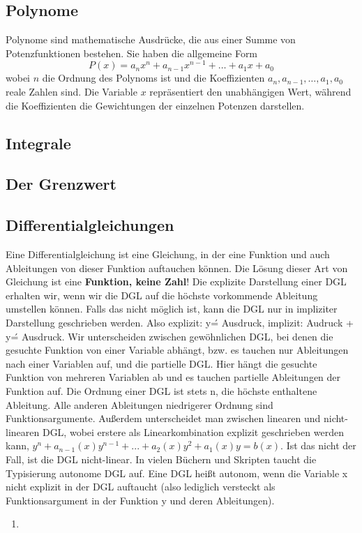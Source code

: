\documentclass[letterpaper, titlepage]{article}
\begin{document}
\subsection{Polynome}\label{Polynome}
Polynome sind mathematische Ausdrücke, die aus einer Summe von Potenzfunktionen bestehen. Sie haben die allgemeine Form 
\begin{equation}
P(x) = a_nx^n + a_{n-1}x^{n-1} + \ldots + a_1x + a_0
\end{equation}
wobei $n$ die Ordnung des Polynoms ist und die Koeffizienten $a_n, a_{n-1}, \ldots, a_1, a_0$ reale Zahlen sind. Die Variable $x$ repräsentiert den unabhängigen Wert, während die Koeffizienten die Gewichtungen der einzelnen Potenzen darstellen. 

\subsection{Integrale}\label{Integrale}

\subsection{Der Grenzwert}\label{Der Grenzwert}

\subsection{Differentialgleichungen}\label{Differentialgleichung}
Eine Differentialgleichung ist eine Gleichung, in der eine Funktion und auch Ableitungen von dieser Funktion auftauchen können. Die Lösung dieser Art von Gleichung ist eine \textbf{Funktion, keine Zahl}! Die explizite Darstellung einer DGL erhalten wir, wenn wir die DGL auf die höchste vorkommende Ableitung umstellen können. Falls das nicht möglich ist, kann die DGL nur in impliziter Darstellung geschrieben werden. Also explizit: y\'= Ausdruck, implizit: Audruck + y\' = Ausdruck. Wir unterscheiden zwischen gewöhnlichen DGL, bei denen die gesuchte Funktion von einer Variable abhängt, bzw. es tauchen nur Ableitungen nach einer Variablen auf, und die partielle DGL. Hier hängt die gesuchte Funktion von mehreren Variablen ab und es tauchen partielle Ableitungen der Funktion auf. Die Ordnung einer DGL ist stets n, die höchste enthaltene Ableitung. Alle anderen Ableitungen niedrigerer Ordnung sind Funktionsargumente. Außerdem unterscheidet man zwischen linearen und nicht-linearen DGL, wobei erstere als Linearkombination explizit geschrieben werden kann, $y^n+a_{n-1}(x)y^{n-1}+...+a_2(x)y^2+a_1(x)y=b(x)$. Ist das nicht der Fall, ist die DGL nicht-linear. In vielen Büchern und Skripten taucht die Typisierung autonome DGL auf. Eine DGL heißt autonom, wenn die Variable x nicht explizit in der DGL auftaucht (also lediglich versteckt als Funktionsargument in der Funktion y und deren Ableitungen).
\begin{enumerate}
    \item 
\end{enumerate}
\end{document}

